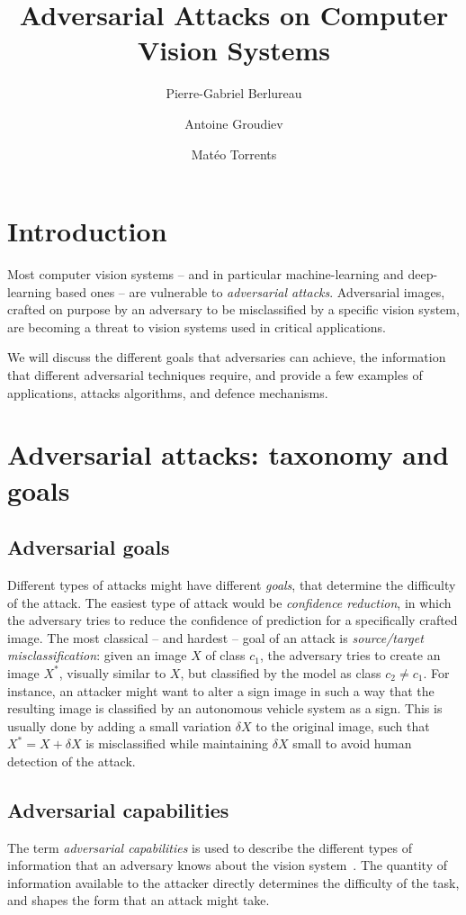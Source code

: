 \documentclass[twocolumn]{../../cs-classes/cs-classes}
\title{Adversarial Attacks on Computer Vision Systems}
\author{Pierre-Gabriel Berlureau\and Antoine Groudiev\and Matéo Torrents}
\date{}
\begin{document}
\maketitle
\section{Introduction}
Most computer vision systems -- and in particular machine-learning and deep-learning based ones -- are vulnerable to \emph{adversarial attacks}. Adversarial images, crafted on purpose by an adversary to be misclassified by a specific vision system, are becoming a threat to vision systems used in critical applications.

We will discuss the different goals that adversaries can achieve, the information that different adversarial techniques require, and provide a few examples of applications, attacks algorithms, and defence mechanisms.

\section{Adversarial attacks: taxonomy and goals}
%
\subsection{Adversarial goals}
Different types of attacks might have different \emph{goals}, that determine the difficulty of the attack. The easiest type of attack would be \emph{confidence reduction}, in which the adversary tries to reduce the
confidence of prediction for a specifically crafted image. The most classical -- and hardest -- goal of an attack is \emph{source/target misclassification}: given an image $X$ of class $c_1$, the adversary tries to create an image $X^*$, visually similar to $X$, but classified by the model as class $c_2\neq c_1$. For instance, an attacker might want to alter a  sign image in such a way that the resulting image is classified by an autonomous vehicle system as a  sign. This is usually done by adding a small variation $\delta X$ to the original image, such that $X^*=X+\delta X$ is misclassified while maintaining $\delta X$ small to avoid human detection of the attack.

\subsection{Adversarial capabilities}
The term \emph{adversarial capabilities} is used to describe the different types of information that an adversary knows about the vision system \cite{chakraborty2021survey}. The quantity of information available to the attacker directly determines the difficulty of the task, and shapes the form that an attack might take.
\end{document}
